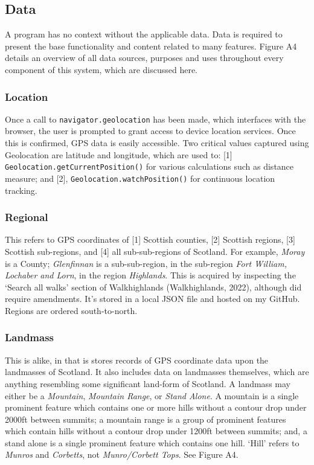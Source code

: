 \documentclass[11pt, english]{article}
\begin{document}
	\subsection{Data}

	A program has no context without the applicable data. Data is required to present the base functionality and content related to many features. Figure A4 details an overview of all data sources, purposes and uses throughout every component of this system, which are discussed here.

		\subsubsection{Location}

	Once a call to \verb|navigator.geolocation| has been made, which interfaces with the browser, the user is prompted to grant access to device location services. Once this is confirmed, GPS data is easily accessible. Two critical values captured using Geolocation are latitude and longitude, which are used to: [1] \verb|Geolocation.getCurrentPosition()| for various calculations such as distance measure; and [2], \verb|Geolocation.watchPosition()| for continuous location tracking.

		\subsubsection{Regional}

	This refers to GPS coordinates of [1] Scottish counties, [2] Scottish regions, [3] Scottish sub-regions, and [4] all sub-sub-regions of Scotland. For example, \textit{Moray} is a County; \textit{Glenfinnan} is a sub-sub-region, in the sub-region \textit{Fort William, Lochaber and Lorn}, in the region \textit{Highlands}. This is acquired by inspecting the `Search all walks' section of Walkhighlands (Walkhighlands, 2022), although did require amendments. It's stored in a local JSON file and hosted on my GitHub. Regions are ordered south-to-north.

		\subsubsection{Landmass}

	This is alike, in that is stores records of GPS coordinate data upon the landmasses of Scotland. It also includes data on landmasses themselves, which are anything resembling some significant land-form of Scotland. A landmass may either be a \textit{Mountain}, \textit{Mountain Range}, or \textit{Stand Alone}. A mountain is a single prominent feature which contains one or more hills without a contour drop under 2000ft between summits; a mountain range is a group of prominent features which contain hills without a contour drop under 1200ft between summits; and, a stand alone is a single prominent feature which contains one hill. `Hill' refers to \textit{Munros} and \textit{Corbetts}, not \textit{Munro/Corbett Tops}. See Figure A4.\\
\end{document}
